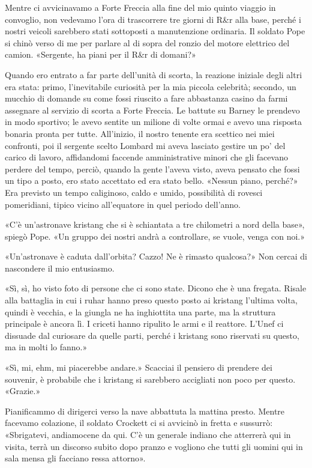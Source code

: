Mentre ci avvicinavamo a Forte Freccia alla fine del mio quinto viaggio
in convoglio, non vedevamo l'ora di trascorrere tre giorni di R\&r alla
base, perché i nostri veicoli sarebbero stati sottoposti a manutenzione
ordinaria. Il soldato Pope si chinò verso di me per parlare al di sopra
del ronzio del motore elettrico del camion. «Sergente, ha piani per il
R\&r di domani?»

Quando ero entrato a far parte dell'unità di scorta, la reazione
iniziale degli altri era stata: primo, l'inevitabile curiosità per la
mia piccola celebrità; secondo, un mucchio di domande su come fossi
riuscito a fare abbastanza casino da farmi assegnare al servizio di
scorta a Forte Freccia. Le battute su Barney le prendevo in modo
sportivo; le avevo sentite un milione di volte ormai e avevo una
risposta bonaria pronta per tutte. All'inizio, il nostro tenente era
scettico nei miei confronti, poi il sergente scelto Lombard mi aveva
lasciato gestire un po' del carico di lavoro, affidandomi faccende
amministrative minori che gli facevano perdere del tempo, perciò, quando
la gente l'aveva visto, aveva pensato che fossi un tipo a posto, ero
stato accettato ed era stato bello. «Nessun piano, perché?» Era previsto
un tempo caliginoso, caldo e umido, possibilità di rovesci pomeridiani,
tipico vicino all'equatore in quel periodo dell'anno.

«C'è un'astronave kristang che si è schiantata a tre chilometri a nord
della base», spiegò Pope. «Un gruppo dei nostri andrà a controllare, se
vuole, venga con noi.»

«Un'astronave è caduta dall'orbita? Cazzo! Ne è rimasto qualcosa?» Non
cercai di nascondere il mio entusiasmo.

«Sì, sì, ho visto foto di persone che ci sono state. Dicono che è una
fregata. Risale alla battaglia in cui i ruhar hanno preso questo posto
ai kristang l'ultima volta, quindi è vecchia, e la giungla ne ha
inghiottita una parte, ma la struttura principale è ancora lì. I criceti
hanno ripulito le armi e il reattore. L'Unef ci dissuade dal curiosare
da quelle parti, perché i kristang sono riservati su questo, ma in molti
lo fanno.»

«Sì, mi, ehm, mi piacerebbe andare.» Scacciai il pensiero di prendere
dei souvenir, è probabile che i kristang si sarebbero accigliati non
poco per questo. «Grazie.»

Pianificammo di dirigerci verso la nave abbattuta la mattina presto.
Mentre facevamo colazione, il soldato Crockett ci si avvicinò in fretta
e sussurrò: «Sbrigatevi, andiamocene da qui. C'è un generale indiano che
atterrerà qui in visita, terrà un discorso subito dopo pranzo e vogliono
che tutti gli uomini qui in sala mensa gli facciano ressa attorno».

